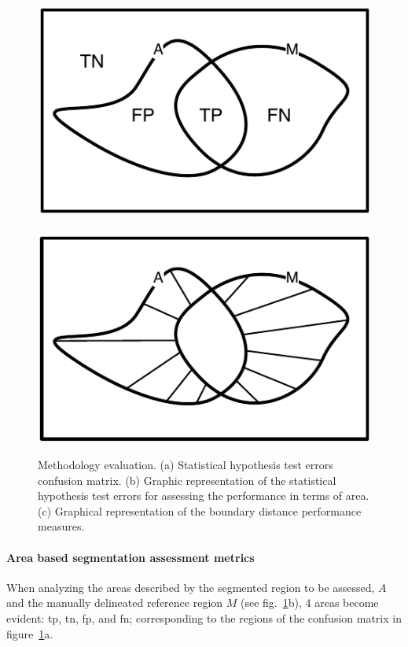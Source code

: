 \begin{figure}
\\
\includegraphics[height=.3\textwidth]{aor}~
\includegraphics[height=.3\textwidth]{disterror}
\caption[Methodology evaluation.]{ Methodology evaluation. (a) Statistical hypothesis test errors confusion matrix. (b) 
Graphic representation of the statistical hypothesis test errors for assessing the performance in terms of area. (c) Graphical representation of the boundary distance performance measures.}
\label{fig:gtEval}
\end{figure}

\paragraph{Area based segmentation assessment metrics}

When analyzing the areas described by the segmented region  to be assessed, $A$ and the manually delineated reference region $M$ (see fig.~\ref{fig:gtEval}b), 4 areas become evident: \acf{tp},  \acf{tn},  \acf{fp},  and \acf{fn}; corresponding to the regions of the confusion matrix in figure~\ref{fig:gtEval}a.


